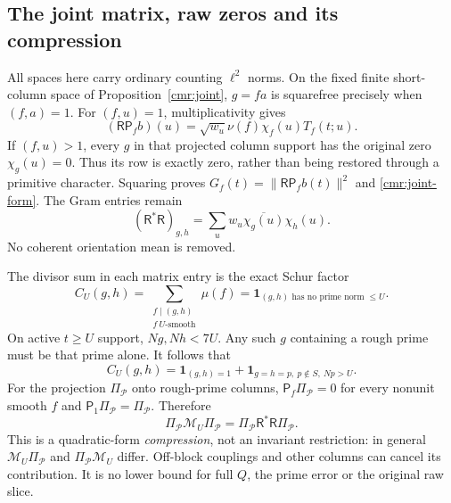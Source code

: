 \documentclass[11pt]{article}
\theoremstyle{definition}\newtheorem{definition}[theorem]{Definition}
\theoremstyle{remark}\newtheorem{remark}[theorem]{Remark}
\begin{document}
\subsection{The joint matrix, raw zeros and its compression}
\label{cmr:joint-proof}
All spaces here carry ordinary counting $\ell^2$ norms. On the fixed
finite short-column space of Proposition~\ref{cmr:joint},
$g=fa$ is squarefree precisely when $(f,a)=1$.
For $(f,u)=1$, multiplicativity gives
\[
 (\mathsf R\mathsf P_fb)(u)
   =\sqrt{w_u}\nu(f)\chi_f(u)T_f(t;u).
\]
If $(f,u)>1$, every $g$ in that projected column support has the
original zero $\chi_g(u)=0$. Thus its row is exactly zero, rather
than being restored through a primitive character. Squaring proves
$G_f(t)=\|\mathsf R\mathsf P_fb(t)\|^2$ and
\eqref{cmr:joint-form}. The Gram entries remain
\[
 (\mathsf R^*\mathsf R)_{g,h}
      =\sum_u w_u\overline{\chi_g(u)}\chi_h(u).
\]
No coherent orientation mean is removed.

The divisor sum in each matrix entry is the exact Schur factor
\[
 C_U(g,h)=\sum_{\substack{f\mid(g,h)\\f\ U\text{-smooth}}}\mu(f)
       =\mathbf1_{(g,h)\text{ has no prime norm }\le U}.
\]
On active $t\ge U$ support, $Ng,Nh<7U$. Any such $g$ containing a
rough prime must be that prime alone. It follows that
\begin{equation}\label{cmr:schur}
 C_U(g,h)=\mathbf1_{(g,h)=1}
       +\mathbf1_{g=h=p,\ p\notin S,\ Np>U}.
\end{equation}
For the projection $\Pi_{\mathcal P}$ onto rough-prime columns,
$\mathsf P_f\Pi_{\mathcal P}=0$ for every nonunit smooth $f$ and
$\mathsf P_1\Pi_{\mathcal P}=\Pi_{\mathcal P}$. Therefore
\begin{equation}\label{cmr:compression}
 \Pi_{\mathcal P}\mathcal M_U\Pi_{\mathcal P}
     =\Pi_{\mathcal P}\mathsf R^*\mathsf R\Pi_{\mathcal P}.
\end{equation}
This is a quadratic-form \emph{compression}, not an invariant
restriction: in general $\mathcal M_U\Pi_{\mathcal P}$ and
$\Pi_{\mathcal P}\mathcal M_U$ differ. Off-block couplings and other
columns can cancel its contribution. It is no lower bound for full
$Q$, the prime error or the original raw slice.
\end{document}

